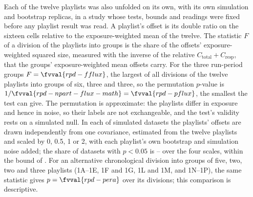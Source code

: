 
Each of the twelve playlists was also unfolded on its own, with its own simulation and bootstrap replicas, in a study whose tests, bounds and readings were fixed before any playlist result was read. A playlist's offset is its double ratio on the sixteen cells relative to the exposure-weighted mean of the twelve. The statistic $F$ of a division of the playlists into groups is the share of the offsets' exposure-weighted squared size, measured with the inverse of the relative $C_{\mathrm{total}}+C_{\mathrm{resp}}$, that the groups' exposure-weighted mean offsets carry. For the three run-period groups $F=\fvval{rpd-fflux}$, the largest of all  divisions of the twelve playlists into groups of six, three and three, so the permutation $p$-value is $1/\fvval{rpd-npart-flux-math}=\fvval{rpd-pflux}$, the smallest the test can give. The permutation is approximate: the playlists differ in exposure and hence in noise, so their labels are not exchangeable, and the test's validity rests on a simulated null. In each of  simulated datasets the playlists' offsets are drawn independently from one covariance, estimated from the twelve playlists and scaled by 0, 0.5, 1 or 2, with each playlist's own bootstrap and simulation noise added; the share of datasets with $p<0.05$ is -- over the four scales, within the bound of . For an alternative chronological division into groups of five, two, two and three playlists (1A--1E, 1F and 1G, 1L and 1M, and 1N--1P), the same statistic gives $p=\fvval{rpd-pera}$ over its  divisions; this comparison is descriptive.

